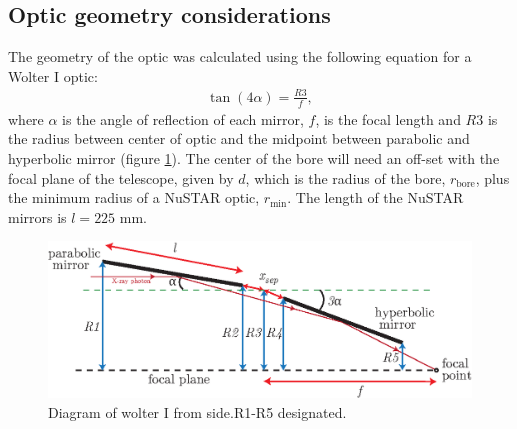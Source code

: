 \subsection{Optic geometry considerations}
The geometry of the optic was calculated using the following equation for a Wolter I optic:
\begin{eqnarray}\label{eq:wolter}
  \tan(4\alpha) = \frac{\mathit{R3}}{f},
\end{eqnarray}
where $\alpha$ is the angle of reflection of each mirror, $f$, is the focal length and $\mathit{R3}$ is the radius between center of optic and the midpoint between parabolic and hyperbolic mirror (figure \ref{fig:wolter1-diagram}). The center of the bore will need an off-set with the focal plane of the telescope, given by $d$, which is the radius of the bore, $r_{\text{bore}}$, plus the minimum radius of a NuSTAR optic, $r_{\text{min}}$. The length of the NuSTAR mirrors is $l = 225$ mm.
\begin{figure}[htbp]
  \centering
    \includegraphics[width=0.95\linewidth]{figures/cast/wolter1-diagram.eps}
  \caption{Diagram of wolter I from side.R1-R5 designated.}
  \label{fig:wolter1-diagram}
\end{figure}

